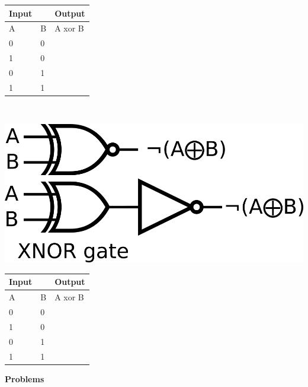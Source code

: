 \begin{minipage}{\linewidth}
    \begin{tabular}{|ll|l|}
        \hline
        Input                   &   & Output  \\ \hline
        \multicolumn{1}{|l|}{A} & B & A xor B \\ \hline
        \multicolumn{1}{|l|}{0} & 0 &        \\ \hline
        \multicolumn{1}{|l|}{1} & 0 &       \\ \hline
        \multicolumn{1}{|l|}{0} & 1 &        \\ \hline
        \multicolumn{1}{|l|}{1} & 1 &        \\ \hline
    \end{tabular}
\end{minipage}\\
\vspace{30mm}
\hspace{1in}
\begin{minipage}{.5\linewidth}
    \includegraphics[width=3 in]{images/xnor_diagram.png}
\end{minipage}
\begin{minipage}{\linewidth}
    \begin{tabular}{|ll|l|}
        \hline
        Input                   &   & Output  \\ \hline
        \multicolumn{1}{|l|}{A} & B & A xor B \\ \hline
        \multicolumn{1}{|l|}{0} & 0 &        \\ \hline
        \multicolumn{1}{|l|}{1} & 0 &       \\ \hline
        \multicolumn{1}{|l|}{0} & 1 &        \\ \hline
        \multicolumn{1}{|l|}{1} & 1 &        \\ \hline
    \end{tabular}
\end{minipage}
\begin{center}
    \textbf{Problems}
\end{center}
